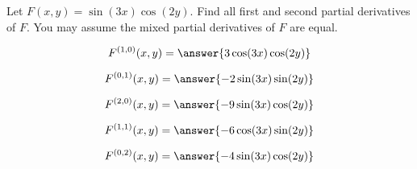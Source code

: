 \documentclass{ximera}
\author{David Guichard \and Neal Koblitz \and H. Jerome Keisler \and Albert Scheller \and Barry Balof \and Mike Wills \and Matthew Carr}
\begin{document}
\begin{exercise}




Let $F(x,y)=\sin(3x)\cos(2y)$. Find all first and second partial derivatives of $F$. You may assume the mixed partial derivatives of $F$ are equal.

\begin{prompt}
\[
F^{(1,0)}(x,y)=\answer{3\cos(3x)\cos(2y)}
\]
\end{prompt}
\begin{prompt}
\[
F^{(0,1)}(x,y)=\answer{-2\sin(3x)\sin(2y)}
\]
\end{prompt}
\begin{prompt}
\[
F^{(2,0)}(x,y)=\answer{-9\sin(3x)\cos(2y)}
\]
\end{prompt}
\begin{prompt}
\[
F^{(1,1)}(x,y)=\answer{-6\cos(3x)\sin(2y)}
\]
\end{prompt}
\begin{prompt}
\[
F^{(0,2)}(x,y)=\answer{-4\sin(3x)\cos(2y)}
\]
\end{prompt}

\end{exercise}
\end{document}
